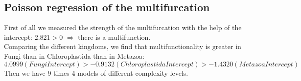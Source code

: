     \subsection{Poisson regression of the multifurcation}
      First of all we measured the strength of the multifurcation with the help of the intercept: 
        $2.821 > 0$ $\Rightarrow$ there is a multifunction. \\
      Comparing the different kingdoms, we find that multifunctionality is greater in Fungi than in 
        Chloroplastida than in Metazoa:
      $$4.0999 (Fungi Intercept) > -0.9132 (Chloroplastida Intercept) > -1.4320 (Metazoa Intercept)$$
      Then we have 9 times 4 models of different complexity levels.
